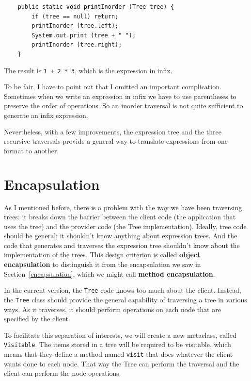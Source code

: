 \documentclass[12pt]{book}
\theoremstyle{exercise}
\begin{document}
\begin{verbatim}
    public static void printInorder (Tree tree) {
        if (tree == null) return;
        printInorder (tree.left);
        System.out.print (tree + " ");
        printInorder (tree.right);
    }
\end{verbatim}
%
The result is {\tt 1 + 2 * 3}, which is the expression in infix.

To be fair, I have to point out that I omitted an
important complication.  Sometimes when we write an expression
in infix we have to use parentheses to preserve the order of
operations.  So an inorder traversal is not quite sufficient to
generate an infix expression.

Nevertheless, with a few improvements, the expression tree 
and the three recursive traversals provide 
a general way to translate expressions from one format to
another.


\section {Encapsulation}

As I mentioned before, there is a problem with the way we have been
traversing trees: it breaks down the barrier between the client code
(the application that uses the tree) and the provider code (the Tree
implementation).  Ideally, tree code should be general; it shouldn't
know anything about expression trees.  And the code that generates and
traverses the expression tree shouldn't know about the implementation
of the trees.  This design criterion is called {\bf object
encapsulation} to distinguish it from the encapsulation we saw in
Section~\ref{encapsulation}, which we might call {\bf method
encapsulation}.

In the current version, the {\tt Tree} code knows too much about
the client.  Instead, the {\tt Tree} class should provide
the general capability of traversing a tree in various ways.  As
it traverses, it should perform operations on each node that are
specified by the client.



To facilitate this separation of interests, we will
create a new metaclass, called {\tt Visitable}.  The items
stored in a tree will be required to be visitable, which means
that they define a method named {\tt visit} that does whatever
the client wants done to each node.  That way the
Tree can perform the traversal and the client can perform
the node operations.
\end{document}
